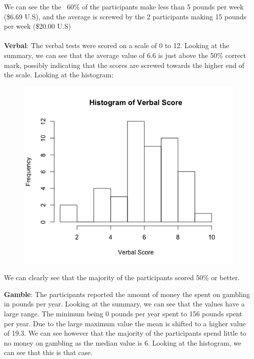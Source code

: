 \documentclass{exam}
\begin{document}
	\noindent
	We can see the the ~60\% of the participants make less than 5 pounds per week (\$6.69 U.S), and the average is screwed by the 2 participants making 15 pounds per week (\$20.00 U.S)
	\\
	\\
	\textbf{Verbal}:
	The verbal tests were scored on a scale of 0 to 12. Looking at the summary, we can see that the average value of 6.6 is just above the 50\% correct mark, possibly indicating that the scores are screwed towards the higher end of the scale. Looking at the histogram: 
	
	\begin{figure}[h]
		\includegraphics[scale=.5]{verbal}
		\centering
		
	\end{figure}
	
	\noindent
	We can clearly see that the majority of the participants scored 50\% or better. 
	\pagebreak
	
	\noindent
	\textbf{Gamble}:
	The participants reported the amount of money the spent on gambling in pounds per year. Looking at the summary, we can see that the values have a large range. The minimum being 0 pounds per year spent to 156 pounds spent per year. Due to the large maximum value the mean is shifted to a higher value of 19.3. We can see however that the majority of the participants spend little to no money on gambling as the median value is 6. Looking at the histogram, we can see that this is that case. 
	
\end{document}
